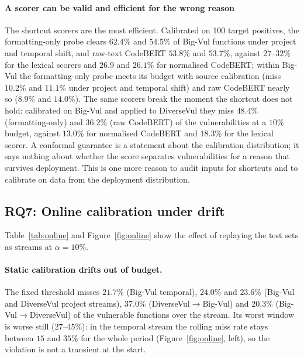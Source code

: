 \paragraph{A scorer can be valid and efficient for the wrong reason}
The shortcut scorers are the most efficient. Calibrated on 100 target positives, the formatting-only probe clears $62.4\%$ and $54.5\%$ of Big-Vul functions under project and temporal shift, and raw-text CodeBERT $53.8\%$ and $53.7\%$, against $27$--$32\%$ for the lexical scorers and $26.9$ and $26.1\%$ for normalised CodeBERT; within Big-Vul the formatting-only probe meets its budget with source calibration (miss $10.2\%$ and $11.1\%$ under project and temporal shift) and raw CodeBERT nearly so ($8.9\%$ and $14.0\%$). The same scorers break the moment the shortcut does not hold: calibrated on Big-Vul and applied to DiverseVul they miss $48.4\%$ (formatting-only) and $36.2\%$ (raw CodeBERT) of the vulnerabilities at a $10\%$ budget, against $13.0\%$ for normalised CodeBERT and $18.3\%$ for the lexical scorer. A conformal guarantee is a statement about the calibration distribution; it says nothing about whether the score separates vulnerabilities for a reason that survives deployment. This is one more reason to audit inputs for shortcuts and to calibrate on data from the deployment distribution.


\subsection{RQ7: Online calibration under drift}\label{sec:rq7}
Table~\ref{tab:online} and Figure~\ref{fig:online} show the effect of replaying the test sets as streams at $\alpha=10\%$.
\paragraph{Static calibration drifts out of budget.} The fixed threshold misses $21.7\%$ (Big-Vul temporal), $24.0\%$ and $23.6\%$ (Big-Vul and DiverseVul project streams), $37.0\%$ (DiverseVul$\to$Big-Vul) and $20.3\%$ (Big-Vul$\to$DiverseVul) of the vulnerable functions over the stream. Its worst window is worse still ($27$--$45\%$): in the temporal stream the rolling miss rate stays between $15$ and $35\%$ for the whole period (Figure~\ref{fig:online}, left), so the violation is not a transient at the start.
